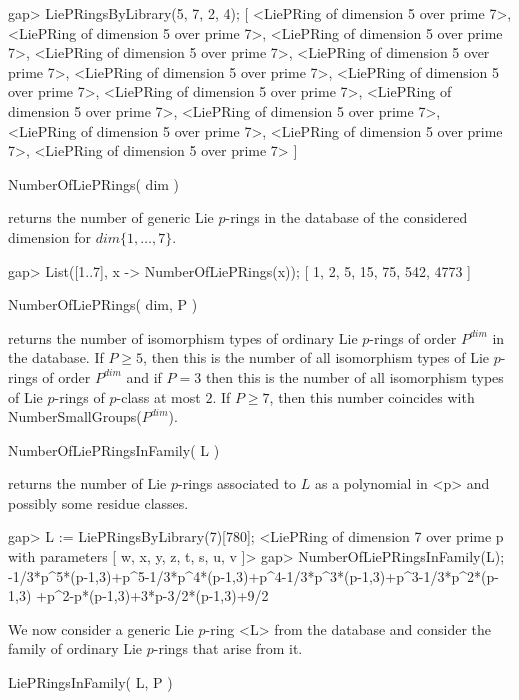 \beginexample
gap> LiePRingsByLibrary(5, 7, 2, 4);
[ <LiePRing of dimension 5 over prime 7>, 
  <LiePRing of dimension 5 over prime 7>, 
  <LiePRing of dimension 5 over prime 7>, 
  <LiePRing of dimension 5 over prime 7>, 
  <LiePRing of dimension 5 over prime 7>, 
  <LiePRing of dimension 5 over prime 7>, 
  <LiePRing of dimension 5 over prime 7>, 
  <LiePRing of dimension 5 over prime 7>, 
  <LiePRing of dimension 5 over prime 7>, 
  <LiePRing of dimension 5 over prime 7>, 
  <LiePRing of dimension 5 over prime 7>, 
  <LiePRing of dimension 5 over prime 7>, 
  <LiePRing of dimension 5 over prime 7> ]
\endexample


\> NumberOfLiePRings( dim )

returns the number of generic Lie $p$-rings in the database of the
considered dimension for $dim \{ 1, \ldots, 7\}$.

\beginexample
gap> List([1..7], x -> NumberOfLiePRings(x));
[ 1, 2, 5, 15, 75, 542, 4773 ]
\endexample

\> NumberOfLiePRings( dim, P )

returns the number of isomorphism types of ordinary Lie $p$-rings of order
$P^{dim}$ in the database. If $P \geq 5$, then this is the number of all
isomorphism types of Lie $p$-rings of order $P^{dim}$ and if $P = 3$ then
this is the number of all isomorphism types of Lie $p$-rings of $p$-class
at most $2$. If $P \geq 7$, then this number coincides with
NumberSmallGroups($P^{dim}$).

\> NumberOfLiePRingsInFamily( L )

returns the number of Lie $p$-rings associated to $L$ as a polynomial in
<p> and possibly some residue classes.

\beginexample
gap> L := LiePRingsByLibrary(7)[780];
<LiePRing of dimension 7 over prime p with parameters
[ w, x, y, z, t, s, u, v ]>
gap> NumberOfLiePRingsInFamily(L);
-1/3*p^5*(p-1,3)+p^5-1/3*p^4*(p-1,3)+p^4-1/3*p^3*(p-1,3)+p^3-1/3*p^2*(p-1,3)
+p^2-p*(p-1,3)+3*p-3/2*(p-1,3)+9/2
\endexample


We now consider a generic Lie $p$-ring <L> from the database and consider
the family of ordinary Lie $p$-rings that arise from it.

\> LiePRingsInFamily( L, P )

